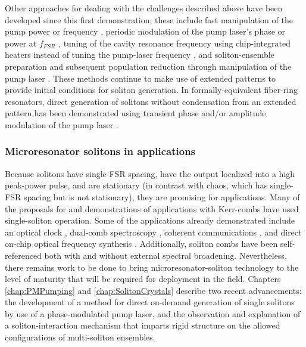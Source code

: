 Other approaches for dealing with the challenges described above have been developed since this first demonstration; these include fast manipulation of the pump power \cite{Brasch2016,Yi2015} or frequency \cite{Stone2017}, periodic modulation of the pump laser's phase or power at $f_{FSR}$ \cite{Lobanov2016,Obrzud2017}, tuning of the cavity resonance frequency using chip-integrated heaters instead of tuning the pump-laser frequency \cite{Joshi2016a,Wang2018a}, and soliton-ensemble preparation and subsequent population reduction through manipulation of the pump laser \cite{Guo2017a}. These methods continue to make use of extended patterns to provide initial conditions for soliton generation. In formally-equivalent fiber-ring resonators, direct generation of solitons without condensation from an extended pattern has been demonstrated using transient phase and/or amplitude modulation of the pump laser \cite{Jang2015,Jang2015a,Wang2018}. 


\subsubsection{Microresonator solitons in applications}

Because solitons have single-FSR spacing, have the output localized into a high peak-power pulse, and are stationary (in contrast with chaos, which has single-FSR spacing but is not stationary), they are promising for applications. Many of the proposals for and demonstrations of applications with Kerr-combs have used single-soliton operation. Some of the applications already demonstrated include an optical clock \cite{Papp2014}, dual-comb spectroscopy \cite{Suh2016a}, coherent communications \cite{Marin-Palomo2017}, and direct on-chip optical frequency synthesis \cite{Spencer2018}. Additionally, soliton combs have been self-referenced both with \cite{Jost2015,DelHaye2016} and without \cite{Brasch2017,Briles2017} external spectral broadening. Nevertheless, there remains work to be done to bring microresonator-soliton technology to the level of maturity that will be required for deployment in the field. Chapters \ref{chap:PMPumping} and \ref{chap:SolitonCrystals} describe two recent advancements: the development of a method for direct on-demand generation of single solitons by use of a phase-modulated pump laser, and the observation and explanation of a soliton-interaction mechanism that imparts rigid structure on the allowed configurations of multi-soliton ensembles.



